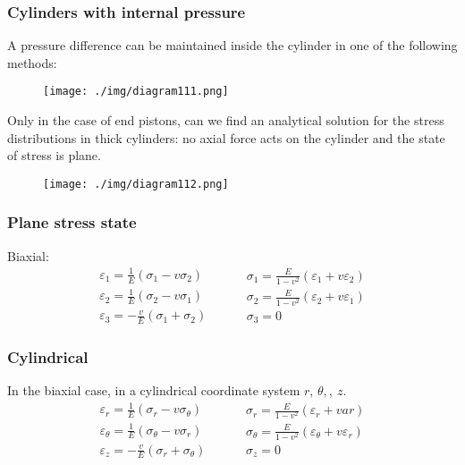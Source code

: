 \subsubsection{Cylinders with internal pressure}
A pressure difference can be maintained inside the cylinder in one of the following methods:
\begin{figure}[H]
  \centering
  \texttt{[image: ./img/diagram111.png]}
  \caption{}
\end{figure}
Only in the case of end pistons, can we find an analytical solution for the stress distributions in thick cylinders: no axial force acts on the cylinder and the state of stress is plane.
\begin{figure}[H]
  \centering
  \texttt{[image: ./img/diagram112.png]}
  \caption{}
\end{figure}
\subsubsection{Plane stress state}
Biaxial:
\begin{equation}
  \begin{array}{l}
    \varepsilon_1 = \frac{1}{E} \left(\sigma_1 - v\sigma_2\right) \\
    \varepsilon_2 = \frac{1}{E} \left(\sigma_2 - v\sigma_1\right) \\
    \varepsilon_3 = -\frac{v}{E} \left(\sigma_1 + \sigma_2\right)
  \end{array} \hspace{1cm}
  \begin{array}{l}
    \sigma_1 = \frac{E}{1-v^2} \left(\varepsilon_1 + v\varepsilon_2\right) \\
    \sigma_2 = \frac{E}{1-v^2} \left(\varepsilon_2 + v\varepsilon_1\right) \\
    \sigma_3 = 0
  \end{array}
\end{equation}
\subsubsection{Cylindrical}
In the biaxial case, in a cylindrical coordinate system $r, \, \theta, ,\ z$.
\begin{equation}
  \begin{array}{l}
    \varepsilon_r = \frac{1}{E} \left(\sigma_r - v\sigma_{\theta}\right)        \\
    \varepsilon_{\theta} = \frac{1}{E} \left(\sigma_{\theta} - v\sigma_r\right) \\
    \varepsilon_z = -\frac{v}{E} \left(\sigma_r + \sigma_{\theta}\right)
  \end{array} \hspace{1cm}
  \begin{array}{l}
    \sigma_r = \frac{E}{1-v^2}\left(\varepsilon_r + var\right)                            \\
    \sigma_{\theta} = \frac{E}{1-v^2} \left(\varepsilon_{\theta} + v \varepsilon_r\right) \\
    \sigma_z = 0
  \end{array}
\end{equation}
